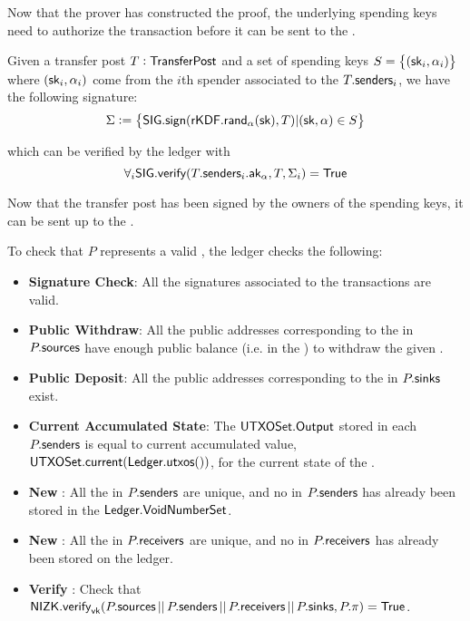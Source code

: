Now that the prover has constructed the proof, the underlying spending keys need to authorize the transaction before it can be sent to the \Ledger{}.

\begin{definition}
    Given a transfer post $T: {\textsf{TransferPost}}{}$ and a set of spending keys $S = \set{({\textsf{sk}}_i, \alpha_i)}$ where $({\textsf{sk}}_i, \alpha_i)$ come from the $i$th spender associated to the $T.{\textsf{senders}}_i$, we have the following signature:
    \[\Sigma := \set{{\textsf{SIG}}.{\textsf{sign}}({\textsf{rKDF}}.{\textsf{rand}}_\alpha({\textsf{sk}}), T) | ({\textsf{sk}}, \alpha) \in S}\]

    which can be verified by the ledger with 
    \[\forall_i{\textsf{SIG}}.{\textsf{verify}}(T.{\textsf{senders}}_i.{\textsf{ak}}_\alpha, T, \Sigma_i) = {\textsf{True}}\]
\end{definition}

Now that the transfer post has been signed by the owners of the spending keys, it can be sent up to the \Ledger{}.

\begin{definition}
    To check that $P$ represents a valid \Transfer{}, the ledger checks the following:
    \begin{itemize}
        \item \textbf{Signature Check}: All the signatures associated to the transactions are valid.
        \item \textbf{Public Withdraw}: All the public addresses corresponding to the  in $P.{\textsf{sources}}$ have enough public balance (i.e. in the \PublicLedger{}) to withdraw the given \Asset{}.
        \item \textbf{Public Deposit}: All the public addresses corresponding to the  in $P.{\textsf{sinks}}$ exist.
        \item \textbf{Current Accumulated State}: The ${\textsf{UTXOSet}}.{\textsf{Output}}$ stored in each $P.{\textsf{senders}}$ is equal to current accumulated value, ${\textsf{UTXOSet}}.{\textsf{current}}({\textsf{Ledger}}.{\textsf{utxos}}())$, for the current state of the \Ledger{}.
        \item \textbf{New }: All the  in $P.{\textsf{senders}}$ are unique, and no \VoidNumber{} in $P.{\textsf{senders}}$ has already been stored in the ${\textsf{Ledger}}.{\textsf{VoidNumberSet}}$.
        \item \textbf{New }: All the  in $P.{\textsf{receivers}}$ are unique, and no \UTXO{} in $P.{\textsf{receivers}}$ has already been stored on the ledger.
        \item \textbf{Verify \Transfer{}}: Check that ${\textsf{NIZK}}.{\textsf{verify}}_{\textsf{vk}}(P.{\textsf{sources}} \,||\, P.{\textsf{senders}} \,||\, P.{\textsf{receivers}} \,||\, P.{\textsf{sinks}}, P.\pi) = {\textsf{True}}$.
    \end{itemize}
\end{definition}

